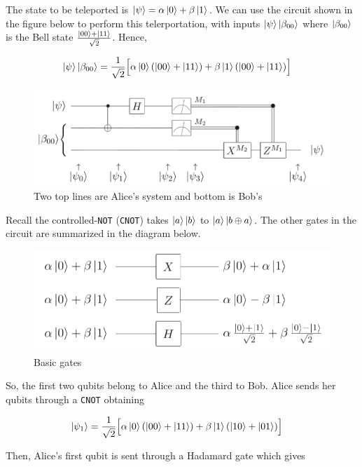 \documentclass[11pt]{article}
\newcommand\0{\mathbf{0}}
\newcommand\<{\langle}
\renewcommand\>{\rangle}
\begin{document}
The state to be teleported is $\ket{\psi} = \alpha\ket{0} + \beta\ket{1}$. We can use the circuit shown in the figure below to perform this telerportation, with inputs $\ket{\psi} \ket{\beta_{00}}$ where $\ket{\beta_{00}}$ is the Bell state $\frac{\ket{00} + \ket{11} }{\sqrt{2}}$. Hence,

\begin{align*}
	\ket{\psi} \ket{\beta_{00}} &= \frac{1}{\sqrt{2}}\Big[\alpha\ket{0}(\ket{00} + \ket{11}) + \beta\ket{1}(\ket{00} + \ket{11})\Big]
\end{align*}


\begin{figure}[H]
\centering
\includegraphics[width=\linewidth]{images/teleportation_circuit.png}	
\caption{Two top lines are Alice's system and bottom is Bob's}
\end{figure}

Recall the controlled-\texttt{NOT} (\texttt{CNOT}) takes $\ket{a}\ket{b}$ to $\ket{a}\ket{b \oplus a}$. The other gates in the circuit are summarized in the diagram below.

\begin{figure}[H]
\centering
\includegraphics[width=0.5\linewidth]{images/basic_gates.png}	
\caption{Basic gates}
\end{figure}

So, the first two qubits belong to Alice and the third to Bob. Alice sends her qubits through a \texttt{CNOT} obtaining

\begin{align*}
\ket{\psi_1} &= \frac{1}{\sqrt{2}}\Big[\alpha\ket{0}(\ket{00} + \ket{11}) + \beta\ket{1}(\ket{10} + \ket{01})\Big]
\end{align*}

Then, Alice's first qubit is sent through a Hadamard gate which gives
\end{document}
